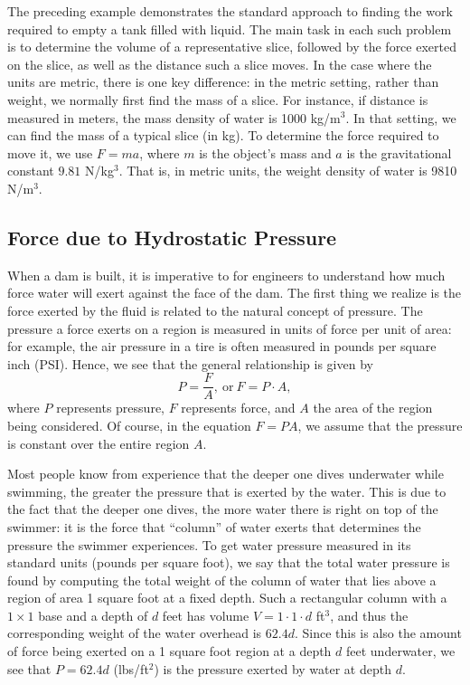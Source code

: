 The preceding example demonstrates the standard approach to finding the work required to empty a tank filled with liquid.  The main task in each such problem is to determine the volume of a representative slice, followed by the force exerted on the slice, as well as the distance such a slice moves.  In the case where the units are metric, there is one key difference:  in the metric setting, rather than weight, we normally first find the mass of a slice.  For instance, if distance is measured in meters, the mass density of water is 1000 kg/m$^3$.  In that setting, we can find the mass of a typical slice (in kg).  To determine the force required to move it, we use $F = ma$, where $m$ is the object's mass and $a$ is the gravitational constant $9.81$ N/kg$^3$.  That is, in metric units, the weight density of water is 9810 N/m$^3$.



\subsection*{Force due to Hydrostatic Pressure} 

When a dam is built, it is imperative to for engineers to understand how much force water will exert against the face of the dam.  The first thing we realize is the force exerted by the fluid is related to the natural concept of pressure.  The pressure a force exerts on a region is measured in units of force per unit of area:  for example, the air pressure in a tire is often measured in pounds per square inch (PSI).  Hence, we see that the general relationship is given by
$$P = \frac{F}{A}, \ \mbox{or} \ F = P \cdot A,$$
where $P$ represents pressure, $F$ represents force, and $A$ the area of the region being considered.  Of course, in the equation $F = PA$, we assume that the pressure is constant over the entire region $A$.

Most people know from experience that the deeper one dives underwater while swimming, the greater the pressure that is exerted by the water.  This is due to the fact that the deeper one dives, the more water there is right on top of the swimmer:  it is the force that ``column'' of water exerts that determines the pressure the swimmer experiences.  To get water pressure measured in its standard units (pounds per square foot), we say that the total water pressure is found by computing the total weight of the column of water that lies above a region of area 1 square foot at a fixed depth.  Such a rectangular column with a $1 \times 1$ base and a depth of $d$ feet has volume $V = 1 \cdot 1 \cdot d$ ft$^3$, and thus the corresponding weight of the water overhead is $62.4d$.  Since this is also the amount of force being exerted on a 1 square foot region at a depth $d$ feet underwater, we see that $P = 62.4 d$ (lbs/ft$^2$) is the pressure exerted by water at depth $d$.

